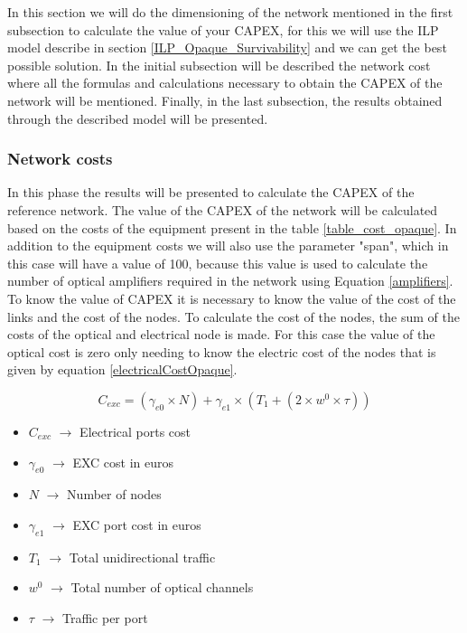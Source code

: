\vspace{11pt}
In this section we will do the dimensioning of the network mentioned in the first subsection to calculate the value of your CAPEX, for this we will use the ILP model describe in section \ref{ILP_Opaque_Survivability} and we can get the best possible solution.
In the initial subsection will be described the network cost where all the formulas and calculations necessary to obtain the CAPEX of the network will be mentioned.
Finally, in the last subsection, the results obtained through the described model will be presented.

\subsubsection{Network costs}\label{Net_Costs}

In this phase the results will be presented to calculate the CAPEX of the reference network.
The value of the CAPEX of the network will be calculated based on the costs of the equipment present in the table \ref{table_cost_opaque}.
In addition to the equipment costs we will also use the parameter "span", which in this case will have a value of 100, because this value is used to calculate the number of optical amplifiers required in the network using Equation \ref{amplifiers}.\\

To know the value of CAPEX it is necessary to know the value of the cost of the links and the cost of the nodes.
To calculate the cost of the nodes, the sum of the costs of the optical and electrical node is made. For this case the value of the optical cost is zero only needing to know the electric cost of the nodes that is given by equation \ref{electricalCostOpaque}.

\begin{equation}
C_{exc} = \left(\gamma_{e0}\times N\right) + \gamma_{e1} \times \left(T_1 + \left(2 \times w^0 \times \tau \right)\right)
\label{electricalCostOpaque}
\end{equation}

\begin{itemize}
\item{$C_{exc}$		$\rightarrow$	Electrical ports cost}
\item{$\gamma_{e0}$	$\rightarrow$	EXC cost in euros}
\item{$N$			$\rightarrow$	Number of nodes}
\item{$\gamma_{e1}$	$\rightarrow$	EXC port cost in euros}
\item{$T_1$         $\rightarrow$   Total unidirectional traffic}
\item{$w^0$			$\rightarrow$	Total number of optical channels}
\item{$\tau$		$\rightarrow$	Traffic per port}
\end{itemize}


